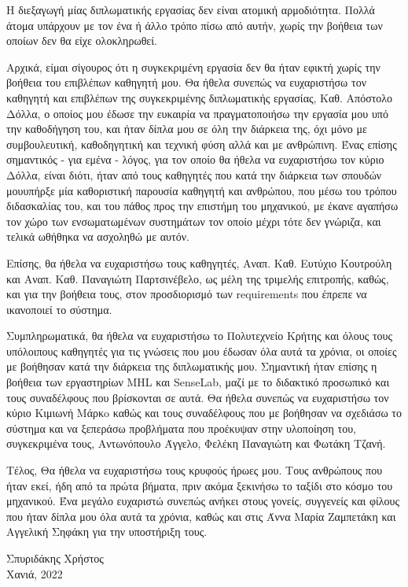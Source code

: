 \begin{acknowledgements}
	\renewcommand\acknowledgementname{Ευχαριστίες}
	\addchaptertocentry{\acknowledgementname} %
	
	Η διεξαγωγή μίας διπλωματικής εργασίας δεν είναι ατομική αρμοδιότητα. Πολλά άτομα υπάρχουν με τον ένα ή άλλο τρόπο πίσω από αυτήν, χωρίς την βοήθεια των οποίων δεν θα είχε ολοκληρωθεί.

	Αρχικά, είμαι σίγουρος ότι η συγκεκριμένη εργασία δεν θα ήταν εφικτή χωρίς την βοήθεια του επιβλέπων καθηγητή μου. Θα ήθελα συνεπώς να ευχαριστήσω τον καθηγητή και επιβλέπων της συγκεκριμένης διπλωματικής εργασίας, Καθ. Α\-πό\-στο\-λο Δόλλα, ο οποίος μου έδωσε την ευκαιρία να πραγματοποιήσω την εργασία μου υπό την καθοδήγηση του, και ήταν δίπλα μου σε όλη την διάρκεια της, όχι μόνο με συμβουλευτική, καθοδηγητική και τεχνική φύση αλλά και με ανθρώπινη. Ένας επίσης σημαντικός - για εμένα - λόγος, για τον οποίο θα ήθελα να ευχαριστήσω τον κύριο Δόλλα, είναι διότι, ήταν από τους καθηγητές που κατά την διάρκεια των σπουδών μου\udot υπήρξε μία καθοριστική παρουσία καθηγητή και ανθρώπου, που μέσω του τρόπου διδασκαλίας του, και του πάθος προς την επιστήμη του μηχανικού, με έκανε αγαπήσω τον χώρο των ενσωματωμένων συστημάτων τον οποίο μέχρι τότε δεν γνώριζα, και τελικά ωθήθηκα να ασχοληθώ με αυτόν.

	Επίσης, θα ήθελα να ευχαριστήσω τους καθηγητές, Αναπ. Καθ. Ευτύχιο Κουτρούλη και Αναπ. Καθ. Παναγιώτη Παρτσινέβελο, ως μέλη της τριμελής επιτροπής, καθώς, και για την βοήθεια τους, στον προσδιορισμό των requirements που έπρεπε να ικανοποιεί το σύστημα.  

	Συμπληρωματικά, θα ήθελα να ευχαριστήσω το Πολυτεχνείο Κρήτης και όλους τους υπόλοιπους καθηγητές για τις γνώσεις που μου έδωσαν όλα αυτά τα χρόνια, οι οποίες με βοήθησαν κατά την διάρκεια της διπλωματικής μου. Σημαντική ήταν επίσης η βοήθεια των εργαστηρίων MHL και SenseLab, μαζί με το διδακτικό προσωπικό και τους συναδέλφους που βρίσκονται σε αυτά. Θα ήθελα συνεπώς να ευχαριστήσω τον κύριο Κιμιωνή Μάρκo καθώς και τους συναδέλφους που με βοήθησαν να σχεδιάσω το σύστημα και να ξεπεράσω προβλήματα που προέκυψαν στην υλοποίηση του, συ\-γκε\-κρι\-μέ\-να τους, Αντωνόπουλο Άγγελο, Φελέκη Παναγιώτη και Φωτάκη Τζανή. 

	Τέλος, Θα ήθελα να ευχαριστήσω τους κρυφούς ήρωες μου. Τους ανθρώπους που ήταν εκεί, ήδη από τα πρώτα βήματα, πριν ακόμα ξεκινήσω το ταξίδι στο κόσμο του μηχανικού. Ένα μεγάλο ευχαριστώ συνεπώς ανήκει στους γονείς, συγγενείς και φίλους που ήταν δίπλα μου όλα αυτά τα χρόνια, καθώς και στις Άννα Μαρία Ζα\-μπε\-τά\-κη και Αγγελική Σηφάκη για την υποστήριξη τους. 

	\begin{flushright}Σπυριδάκης Χρήστος\\ Χανιά, 2022\end{flushright}
\end{acknowledgements}
